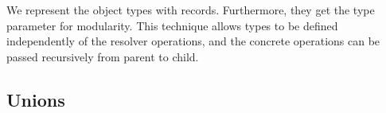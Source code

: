 \begin{frame}

We represent the object types with records. Furthermore, they get the type parameter  for modularity.
This technique allows types to be defined independently of the resolver operations, and the concrete operations can be passed recursively from parent to child. 


\end{frame}

\subsection{Unions}
